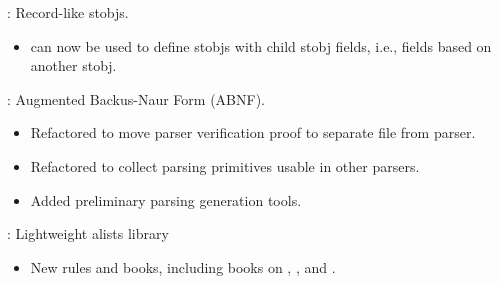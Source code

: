 
\begin{frame}

\implibtitle

:
Record-like stobjs.
\begin{itemize}
\item {} can now be used to define stobjs with child
      stobj fields, i.e., fields based on another stobj.
\end{itemize}

\end{frame}


\begin{frame}

\implibtitle

:
Augmented Backus-Naur Form (ABNF).
\begin{itemize}
\item Refactored to move parser verification proof to separate file from parser.
\item Refactored to collect parsing primitives usable in other parsers.
\item Added preliminary parsing generation tools.
\end{itemize}

\end{frame}


\begin{frame}

\implibtitle

: Lightweight alists library

\begin{itemize}

\item New rules and books, including books on ,
  , and .

\end{itemize}

\end{frame}


